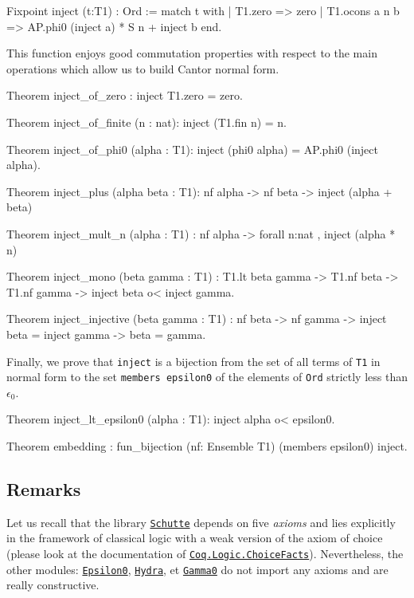 {\begin{Coqsrc}
Fixpoint inject (t:T1) : Ord :=
 match t with 
     | T1.zero => zero
     | T1.ocons a n b =>  AP.phi0 (inject a) * S n + inject b
 end.  
\end{Coqsrc}

This function enjoys good commutation properties with respect to the main operations which
allow us to build Cantor normal form.

\begin{Coqsrc}
Theorem inject_of_zero : inject T1.zero = zero.

Theorem inject_of_finite (n : nat):
  inject (T1.fin n) =  n.

Theorem inject_of_phi0 (alpha : T1):
  inject (phi0 alpha) = AP.phi0 (inject alpha).

Theorem inject_plus (alpha beta : T1): nf alpha -> nf beta ->
  inject (alpha + beta)%


Theorem inject_mult_n (alpha : T1)  :
  nf alpha -> forall n:nat , inject (alpha *  n)%

Theorem inject_mono (beta gamma : T1) :
  T1.lt  beta gamma -> 
  T1.nf beta -> T1.nf gamma -> 
  inject beta o< inject gamma.

Theorem inject_injective (beta gamma : T1) : nf beta -> nf gamma ->
  inject beta = inject gamma -> beta = gamma.
\end{Coqsrc}

Finally, we prove that \texttt{inject} is a bijection from the set of all terms of \texttt{T1} in normal form to the set 
\texttt{members epsilon0} of the elements of \texttt{Ord} strictly less than  $\epsilon_0$.

\begin{Coqsrc}
 Theorem inject_lt_epsilon0 (alpha : T1):
      inject alpha o< epsilon0.

Theorem embedding : 
     fun_bijection (nf: Ensemble T1)  (members epsilon0) inject.
 \end{Coqsrc}
\subsection{Remarks}
Let us recall that the library \href{../src/html/hydras.Schutte.Schutte.html}%
{\texttt{Schutte}} depends on five \emph{axioms} and lies explicitly in the  
framework of classical logic with a weak version of the axiom of choice
(please look at the documentation of
\href{https://coq.inria.fr/distrib/current/stdlib/Coq.Logic.ChoiceFacts.html}{\texttt{Coq.Logic.ChoiceFacts}}).
Nevertheless, the other modules:
\href{../src/html/hydras.Epsilon0.Epsilon0.html}%
{\texttt{Epsilon0}},
\href{../src/html/hydras.Hydra.Hydra.html}%
{\texttt{Hydra}}, et 
\href{../src/html/hydras.Gamma0.Gamma0.html}%
{\texttt{Gamma0}}
do not import any axioms and are really constructive.

}
